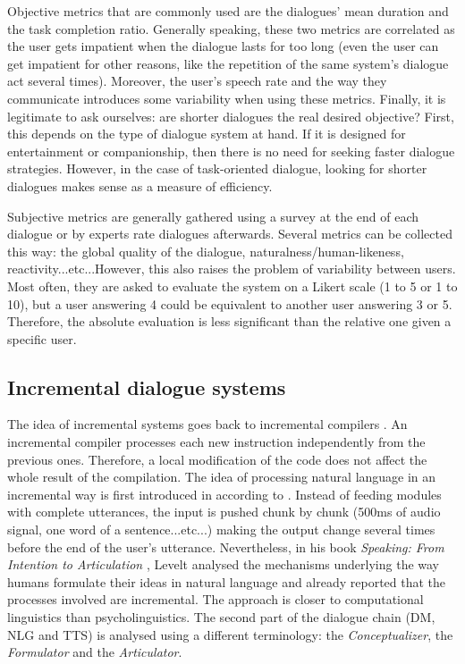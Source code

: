 		Objective metrics that are commonly used are the dialogues' mean duration and the task completion ratio. Generally speaking, these two metrics are correlated as the user gets impatient when the dialogue lasts for too long (even the user can get impatient for other reasons, like the repetition of the same system's dialogue act several times). Moreover, the user's speech rate and the way they communicate introduces some variability when using these metrics. Finally, it is legitimate to ask ourselves: are shorter dialogues the real desired objective? First, this depends on the type of dialogue system at hand. If it is designed for entertainment or companionship, then there is no need for seeking faster dialogue strategies. However, in the case of task-oriented dialogue, looking for shorter dialogues makes sense as a measure of efficiency.

		Subjective metrics are generally gathered using a survey at the end of each dialogue or by experts rate dialogues afterwards\cite{El-Asri2014b}. Several metrics can be collected this way: the global quality of the dialogue, naturalness/human-likeness, reactivity...etc...However, this also raises the problem of variability between users. Most often, they are asked to evaluate the system on a Likert scale (1 to 5 or 1 to 10), but a user answering 4 could be equivalent to another user answering 3 or 5. Therefore, the absolute evaluation is less significant than the relative one given a specific user.

	\subsection{Incremental dialogue systems}
    
		The idea of incremental systems goes back to incremental compilers \cite{Lock1965}. An incremental compiler processes each new instruction independently from the previous ones. Therefore, a local modification of the code does not affect the whole result of the compilation. The idea of processing natural language in an incremental way is first introduced in \cite{Wiren1992} according to \cite{Kilger1995}. Instead of feeding modules with complete utterances, the input is pushed chunk by chunk (500ms of audio signal, one word of a sentence...etc...) making the output change several times before the end of the user's utterance. Nevertheless, in his book \textit{Speaking: From Intention to Articulation} \cite{Levelt1989}, Levelt analysed the mechanisms underlying the way humans formulate their ideas in natural language and already reported that the processes involved are incremental. The approach is closer to computational linguistics than psycholinguistics. The second part of the dialogue chain (DM, NLG and TTS) is analysed using a different terminology: the \textit{Conceptualizer}, the \textit{Formulator} and the \textit{Articulator}.

